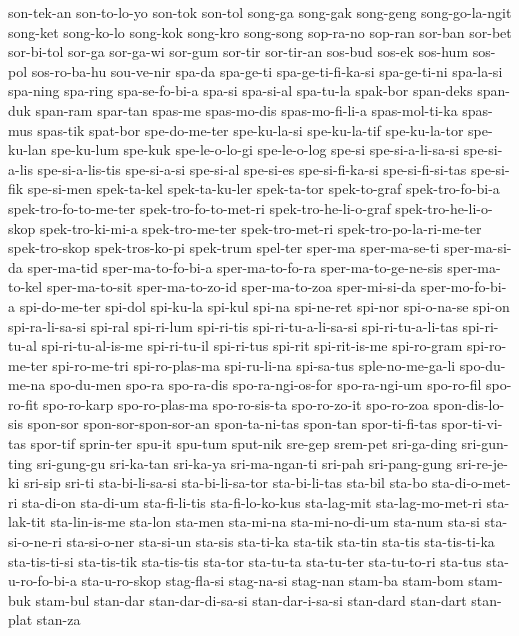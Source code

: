 {son-tek-an son-to-lo-yo son-tok son-tol song-ga song-gak song-geng
song-go-la-ngit song-ket song-ko-lo song-kok song-kro song-song sop-ra-no
sop-ran sor-ban sor-bet sor-bi-tol sor-ga sor-ga-wi sor-gum sor-tir
sor-tir-an sos-bud sos-ek sos-hum sos-pol sos-ro-ba-hu sou-ve-nir spa-da
spa-ge-ti spa-ge-ti-fi-ka-si spa-ge-ti-ni spa-la-si spa-ning spa-ring
spa-se-fo-bi-a spa-si spa-si-al spa-tu-la spak-bor span-deks span-duk
span-ram spar-tan spas-me spas-mo-dis spas-mo-fi-li-a spas-mol-ti-ka
spas-mus spas-tik spat-bor spe-do-me-ter spe-ku-la-si spe-ku-la-tif
spe-ku-la-tor spe-ku-lan spe-ku-lum spe-kuk spe-le-o-lo-gi spe-le-o-log
spe-si spe-si-a-li-sa-si spe-si-a-lis spe-si-a-lis-tis spe-si-a-si
spe-si-al spe-si-es spe-si-fi-ka-si spe-si-fi-si-tas spe-si-fik spe-si-men
spek-ta-kel spek-ta-ku-ler spek-ta-tor spek-to-graf spek-tro-fo-bi-a
spek-tro-fo-to-me-ter spek-tro-fo-to-met-ri spek-tro-he-li-o-graf
spek-tro-he-li-o-skop spek-tro-ki-mi-a spek-tro-me-ter spek-tro-met-ri
spek-tro-po-la-ri-me-ter spek-tro-skop spek-tros-ko-pi spek-trum spel-ter
sper-ma sper-ma-se-ti sper-ma-si-da sper-ma-tid sper-ma-to-fo-bi-a
sper-ma-to-fo-ra sper-ma-to-ge-ne-sis sper-ma-to-kel sper-ma-to-sit
sper-ma-to-zo-id sper-ma-to-zoa sper-mi-si-da sper-mo-fo-bi-a
spi-do-me-ter spi-dol spi-ku-la spi-kul spi-na spi-ne-ret spi-nor
spi-o-na-se spi-on spi-ra-li-sa-si spi-ral spi-ri-lum spi-ri-tis
spi-ri-tu-a-li-sa-si spi-ri-tu-a-li-tas spi-ri-tu-al spi-ri-tu-al-is-me
spi-ri-tu-il spi-ri-tus spi-rit spi-rit-is-me spi-ro-gram spi-ro-me-ter
spi-ro-me-tri spi-ro-plas-ma spi-ru-li-na spi-sa-tus sple-no-me-ga-li
spo-du-me-na spo-du-men spo-ra spo-ra-dis spo-ra-ngi-os-for spo-ra-ngi-um
spo-ro-fil spo-ro-fit spo-ro-karp spo-ro-plas-ma spo-ro-sis-ta
spo-ro-zo-it spo-ro-zoa spon-dis-lo-sis spon-sor spon-sor-spon-sor-an
spon-ta-ni-tas spon-tan spor-ti-fi-tas spor-ti-vi-tas spor-tif sprin-ter
spu-it spu-tum sput-nik sre-gep srem-pet sri-ga-ding sri-gun-ting
sri-gung-gu sri-ka-tan sri-ka-ya sri-ma-ngan-ti sri-pah sri-pang-gung
sri-re-je-ki sri-sip sri-ti sta-bi-li-sa-si sta-bi-li-sa-tor sta-bi-li-tas
sta-bil sta-bo sta-di-o-met-ri sta-di-on sta-di-um sta-fi-li-tis
sta-fi-lo-ko-kus sta-lag-mit sta-lag-mo-met-ri sta-lak-tit sta-lin-is-me
sta-lon sta-men sta-mi-na sta-mi-no-di-um sta-num sta-si sta-si-o-ne-ri
sta-si-o-ner sta-si-un sta-sis sta-ti-ka sta-tik sta-tin sta-tis
sta-tis-ti-ka sta-tis-ti-si sta-tis-tik sta-tis-tis sta-tor sta-tu-ta
sta-tu-ter sta-tu-to-ri sta-tus sta-u-ro-fo-bi-a sta-u-ro-skop stag-fla-si
stag-na-si stag-nan stam-ba stam-bom stam-buk stam-bul stan-dar
stan-dar-di-sa-si stan-dar-i-sa-si stan-dard stan-dart stan-plat stan-za
}
